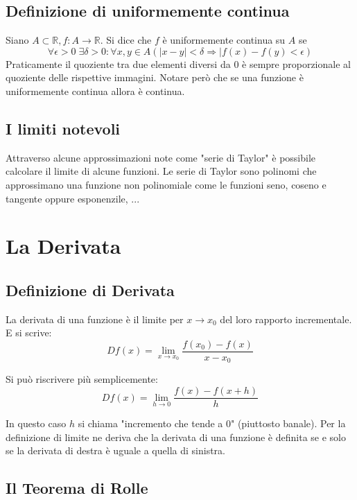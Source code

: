 \documentclass{article}
\begin{document}
\subsection{Definizione di uniformemente continua}
Siano $A \subset \mathbb{R}, f: A \rightarrow \mathbb{R}$. Si dice che $f$ è uniformemente continua su $A$ se
\begin{equation*}
	\forall \epsilon>0 \; \exists \delta >0 : \forall x,y\in A (|x-y|<\delta \Rightarrow |f(x)-f(y)<\epsilon)
\end{equation*}
Praticamente il quoziente tra due elementi diversi da $0$ è sempre proporzionale al quoziente delle rispettive immagini. Notare però che se una funzione è uniformemente continua allora è continua.

\subsection{I limiti notevoli}
Attraverso alcune approssimazioni note come "serie di Taylor" è possibile calcolare il limite di alcune funzioni. Le serie di Taylor sono polinomi che approssimano una funzione non polinomiale come le funzioni seno, coseno e tangente oppure esponenzile, ...

\section{La Derivata}

\subsection{Definizione di Derivata}

La derivata di una funzione è il limite per $x \rightarrow x_0$ del loro rapporto incrementale. E si scrive:
\begin{equation*}
	Df(x)= \lim_{x \to x_0}\frac{f(x_0)-f(x)}{x-x_0}
\end{equation*}

Si può riscrivere più semplicemente:
\begin{equation}
	Df(x)= \lim_{h \to 0}\frac{f(x)-f(x+h)}{h}
\end{equation}

In questo caso $h$ si chiama "incremento che tende a 0" (piuttosto banale).
Per la definizione di limite ne deriva che la derivata di una funzione è definita se e solo se la derivata di destra è uguale a quella di sinistra.

\subsection{Il Teorema di Rolle}
\end{document}
